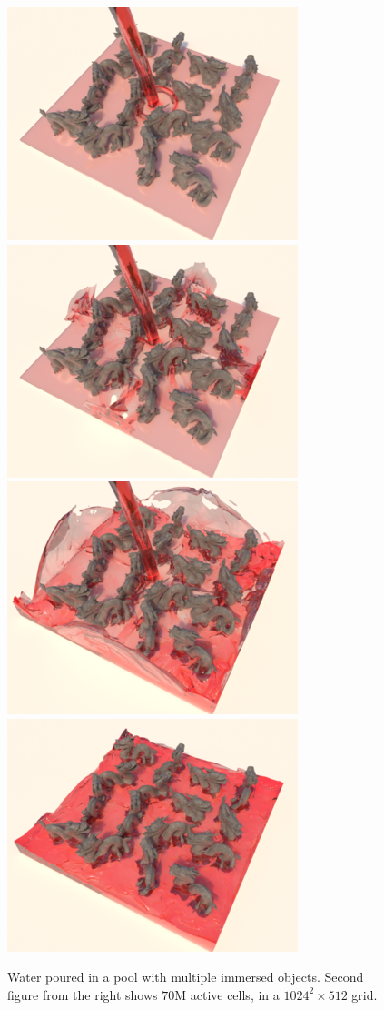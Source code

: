\begin{figure}[t]
\begin{center}
\includegraphics[width=.240\textwidth]{images/DD/dragons_028.png} \includegraphics[width=.240\textwidth]{images/DD/dragons_050.png} \includegraphics[width=.240\textwidth]{images/DD/dragons_115.png} \includegraphics[width=.240\textwidth]{images/DD/dragons_220.png}
\end{center}
\caption{Water poured in a pool with multiple immersed objects. Second figure from the right shows $70$M  active cells, in a $1024^2\!\times\!512$ grid.}
\label{fig:free-surface-flow}
\end{figure}
